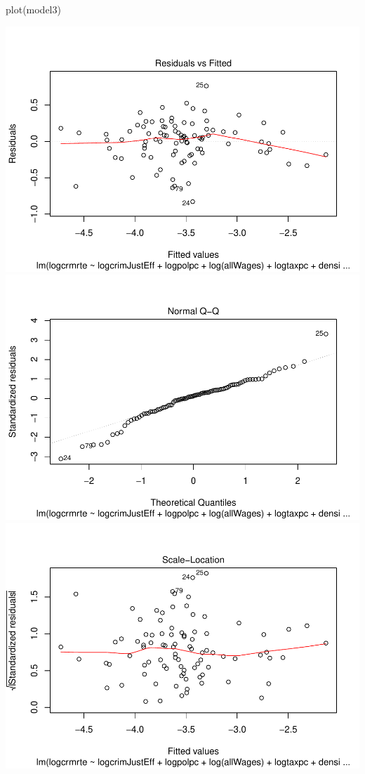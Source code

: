 \documentclass[]{article}
\newenvironment{Shaded}{}{}
\newcommand{\KeywordTok}[1]{\textcolor[rgb]{0.00,0.00,1.00}{#1}}
\newcommand{\NormalTok}[1]{#1}
\begin{document}
\begin{Shaded}
\begin{Highlighting}[]
\KeywordTok{plot}\NormalTok{(model3)}
\end{Highlighting}
\end{Shaded}

\includegraphics{Bagnard_Gaustad_Hartman_Leung_Lab_3_files/figure-latex/unnamed-chunk-100-1.pdf}
\includegraphics{Bagnard_Gaustad_Hartman_Leung_Lab_3_files/figure-latex/unnamed-chunk-100-2.pdf}
\includegraphics{Bagnard_Gaustad_Hartman_Leung_Lab_3_files/figure-latex/unnamed-chunk-100-3.pdf}
\end{document}
